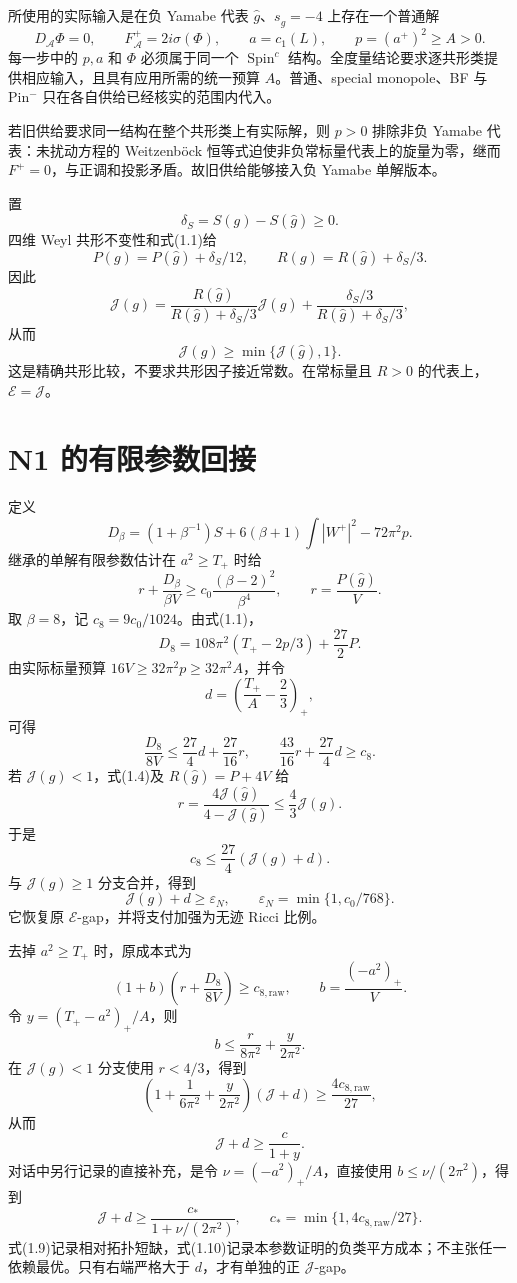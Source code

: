 \documentclass[UTF8,11pt,fontset=none]{ctexart}
\theoremstyle{definition}
\theoremstyle{remark}
\begin{document}
所使用的实际输入是在负 Yamabe 代表 \(\widehat g\)、\(s_{\widehat g}=-4\) 上存在一个普通解 \[
 D_{\mathcal A}\Phi=0,\qquad F_{\mathcal A}^+=2i\sigma(\Phi),
 \qquad a=c_1(L),\qquad p=(a^+)^2\ge A>0.
\tag{1.3}
\] 每一步中的 \(p,a\) 和 \(\Phi\) 必须属于同一个 \(\operatorname{Spin}^c\) 结构。全度量结论要求逐共形类提供相应输入，且具有应用所需的统一预算 \(A\)。普通、special monopole、BF 与 Pin\({}^{-}\) 只在各自供给已经核实的范围内代入。

若旧供给要求同一结构在整个共形类上有实际解，则 \(p>0\) 排除非负 Yamabe 代表：未扰动方程的 Weitzenböck 恒等式迫使非负常标量代表上的旋量为零，继而 \(F^+=0\)，与正调和投影矛盾。故旧供给能够接入负 Yamabe 单解版本。\cite{I01}

置 \[
 \delta_S=S(g)-S(\widehat g)\ge0.
\] 四维 Weyl 共形不变性和式(1.1)给 \[
 P(g)=P(\widehat g)+\delta_S/12,\qquad
 R(g)=R(\widehat g)+\delta_S/3.
\] 因此 \[
 \mathcal J(g)=
 \frac{R(\widehat g)}{R(\widehat g)+\delta_S/3}\mathcal J(\widehat g)
 +\frac{\delta_S/3}{R(\widehat g)+\delta_S/3},
\] 从而 \[
 \boxed{\mathcal J(g)\ge\min\{\mathcal J(\widehat g),1\}.}
\tag{1.4}
\] 这是精确共形比较，不要求共形因子接近常数。在常标量且 \(R>0\) 的代表上，\(\mathcal E=\mathcal J\)。

\section{N1 的有限参数回接}\label{v1-n1-ux7684ux6709ux9650ux53c2ux6570ux56deux63a5}

定义 \[
 D_\beta=(1+\beta^{-1})S+6(\beta+1)\int|W^+|^2-72\pi^2p.
\tag{1.5}
\] 继承的单解有限参数估计在 \(a^2\ge T_+\) 时给 \[
 r+\frac{D_\beta}{\beta V}\ge
 c_0\frac{(\beta-2)^2}{\beta^4},\qquad r=\frac{P(\widehat g)}V.
\tag{1.6}
\] 取 \(\beta=8\)，记 \(c_8=9c_0/1024\)。由式(1.1)， \[
 D_8=108\pi^2(T_+-2p/3)+\frac{27}{2}P.
\tag{1.7}
\] 由实际标量预算 \(16V\ge32\pi^2p\ge32\pi^2A\)，并令 \[
 d=\left(\frac{T_+}{A}-\frac23\right)_+,
\] 可得 \[
 \frac{D_8}{8V}\le\frac{27}{4}d+\frac{27}{16}r,
 \qquad \frac{43}{16}r+\frac{27}{4}d\ge c_8.
\] 若 \(\mathcal J(g)<1\)，式(1.4)及 \(R(\widehat g)=P+4V\) 给 \[
 r=\frac{4\mathcal J(\widehat g)}{4-\mathcal J(\widehat g)}
 \le\frac43\mathcal J(g).
\] 于是 \[
 c_8\le\frac{27}{4}(\mathcal J(g)+d).
\] 与 \(\mathcal J(g)\ge1\) 分支合并，得到 \[
 \boxed{\mathcal J(g)+d\ge\varepsilon_N,
 \qquad \varepsilon_N=\min\{1,c_0/768\}.}
\tag{1.8}
\] 它恢复原 \(\mathcal E\)-gap，并将支付加强为无迹 Ricci 比例。\cite{I01}

去掉 \(a^2\ge T_+\) 时，原成本式为 \[
 (1+b)\left(r+\frac{D_8}{8V}\right)\ge c_{8,\mathrm{raw}},
 \qquad b=\frac{(-a^2)_+}{V}.
\] 令 \(y=(T_+-a^2)_+/A\)，则 \[
 b\le\frac r{8\pi^2}+\frac y{2\pi^2}.
\] 在 \(\mathcal J(g)<1\) 分支使用 \(r<4/3\)，得到 \[
 \left(1+\frac1{6\pi^2}+\frac y{2\pi^2}\right)(\mathcal J+d)
 \ge\frac{4c_{8,\mathrm{raw}}}{27},
\] 从而 \[
 \boxed{\mathcal J+d\ge\frac{c}{1+y}.}
\tag{1.9}
\] 对话中另行记录的直接补充，是令 \(\nu=(-a^2)_+/A\)，直接使用 \(b\le\nu/(2\pi^2)\)，得到 \[
 \boxed{\mathcal J+d\ge
 \frac{c_*}{1+\nu/(2\pi^2)},\qquad
 c_*=\min\{1,4c_{8,\mathrm{raw}}/27\}.}
\tag{1.10}
\] 式(1.9)记录相对拓扑短缺，式(1.10)记录本参数证明的负类平方成本；不主张任一依赖最优。只有右端严格大于 \(d\)，才有单独的正 \(\mathcal J\)-gap。
\end{document}
